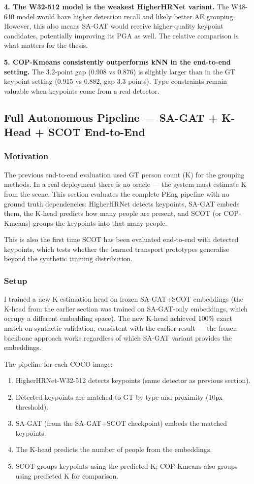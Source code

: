 \textbf{4. The W32-512 model is the weakest HigherHRNet variant.} The W48-640 model would have higher detection recall and likely better AE grouping. However, this also means SA-GAT would receive higher-quality keypoint candidates, potentially improving its PGA as well. The relative comparison is what matters for the thesis.

\textbf{5. COP-Kmeans consistently outperforms kNN in the end-to-end setting.} The 3.2-point gap (0.908 vs 0.876) is slightly larger than in the GT keypoint setting (0.915 vs 0.882, gap 3.3 points). Type constraints remain valuable when keypoints come from a real detector.


\subsection{Full Autonomous Pipeline --- SA-GAT + K-Head + SCOT End-to-End}

\subsubsection{Motivation}

The previous end-to-end evaluation used GT person count (K) for the grouping methods. In a real deployment there is no oracle --- the system must estimate K from the scene. This section evaluates the complete PEng pipeline with no ground truth dependencies: HigherHRNet detects keypoints, SA-GAT embeds them, the K-head predicts how many people are present, and SCOT (or COP-Kmeans) groups the keypoints into that many people.

This is also the first time SCOT has been evaluated end-to-end with detected keypoints, which tests whether the learned transport prototypes generalise beyond the synthetic training distribution.

\subsubsection{Setup}

I trained a new K estimation head on frozen SA-GAT+SCOT embeddings (the K-head from the earlier section was trained on SA-GAT-only embeddings, which occupy a different embedding space). The new K-head achieved 100\% exact match on synthetic validation, consistent with the earlier result --- the frozen backbone approach works regardless of which SA-GAT variant provides the embeddings.

The pipeline for each COCO image:
\begin{enumerate}
    \item HigherHRNet-W32-512 detects keypoints (same detector as previous section).
    \item Detected keypoints are matched to GT by type and proximity (10px threshold).
    \item SA-GAT (from the SA-GAT+SCOT checkpoint) embeds the matched keypoints.
    \item The K-head predicts the number of people from the embeddings.
    \item SCOT groups keypoints using the predicted K; COP-Kmeans also groups using predicted K for comparison.
\end{enumerate}

